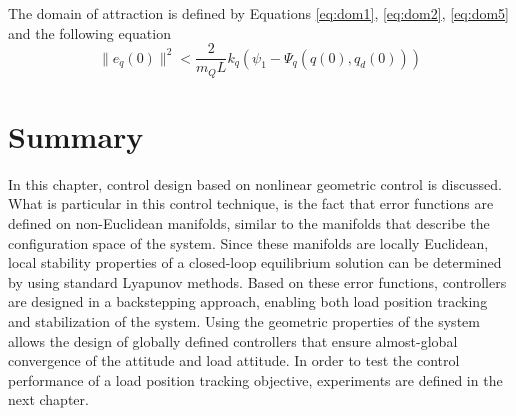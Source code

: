 The domain of attraction is defined by Equations \ref{eq:dom1}, \ref{eq:dom2}, \ref{eq:dom5} and the following equation
\begin{equation}
\parallel e_{\dot{q}}(0)\parallel^2<\frac{2}{m_QL}{k_q}(\psi_1-\Psi_q(q(0),q_d(0)))
\end{equation}

%
%
%
%
%
%
%
%
%
%
%


\section*{Summary}
In this chapter, control design based on nonlinear geometric control is discussed.
What is particular in this control technique, is the fact that error functions are defined on non-Euclidean manifolds, similar to the manifolds that describe the configuration space of the system.
Since these manifolds are locally Euclidean, local stability properties of a closed-loop equilibrium solution can be determined by using standard Lyapunov methods. 
Based on these error functions, controllers are designed in a backstepping approach, enabling both load position tracking and stabilization of the system.
Using the geometric properties of the system allows the design of globally defined controllers that ensure almost-global convergence of the  attitude and load attitude.
In order to test the control performance of a load position tracking objective, experiments are defined in the next chapter. 








